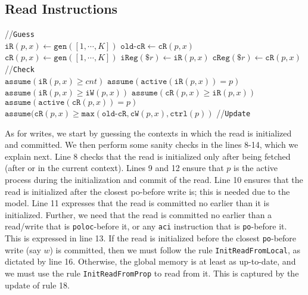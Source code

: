 \documentclass{article}
\newcommand{\var}{\texttt}
\begin{document}
\subsection{Read Instructions}
\begin{algorithm}[H]
  \SetAlgoLined
  //\var{Guess}\\
  $\var{iR}(p,x) \gets \var{gen}([1,\cdots,K])$\;
  $\var{old-cR} \gets \var{cR}(p,x)$\;
  $\var{cR}(p,x) \gets \var{gen}([1,\cdots,K])$\;
  $\var{iReg}(\$r) \gets \var{iR}(p,x)$\;
  $\var{cReg}(\$r) \gets \var{cR}(p,x)$\;
  //\var{Check}\\
  $\var{assume}(\var{iR}(p,x) \geq cnt)$\;
  $\var{assume}(\var{active}(\var{iR}(p,x)) = p)$\;
  $\var{assume}(\var{iR}(p,x) \geq \var{iW}(p,x))$\;
  $\var{assume}(\var{cR}(p,x) \geq \var{iR}(p,x))$\;
  $\var{assume}(\var{active}(\var{cR}(p,x)) = p)$\;
  $\var{assume}(\var{cR}(p,x) \geq \var{max}(\var{old-cR},\var{cW}(p,x),\var{ctrl}(p))$\;
  //\var{Update}\\
  \uIf{$\var{iR}(p,x) < \var{cW}(p,x)$}{
    $\$r \gets \nu(p,x)$\;
  }
  \Else{
    $\$r \gets \mu(x,\var{iR}(p,x))$\;
  }
  \caption{$\llbracket \$r \leftarrow x\rrbracket_K^{p,\var{Read}}$}
\end{algorithm}
As for writes, we start by guessing the contexts in which the read is initialized and committed. We then perform some sanity checks in the lines 8-14, which we explain next. Line 8 checks that the read is initialized only after being fetched (after or in the current context). Lines 9 and 12 ensure that $p$ is the active process during the initialization and commit of the read. Line 10 ensures that the read is initialized after the closest po-before write is; this is needed due to the model. Line 11 expresses that the read is committed no earlier than it is initialized. Further, we need that the read is committed no earlier than a read/write that is \var{poloc}-before it, or any \var{aci} instruction that is \var{po}-before it. This is expressed in line 13. If the read is initialized before the closest \var{po}-before write (say $w$) is committed, then we must follow the rule \var{InitReadFromLocal}, as dictated by line 16. Otherwise, the global memory is at least as up-to-date, and we must use the rule \var{InitReadFromProp} to read from it. This is captured by the update of rule 18. 
\end{document}
